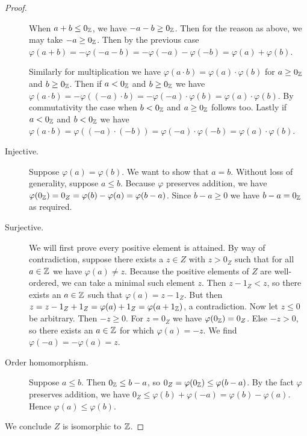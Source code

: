 \documentclass[../main.tex]{subfiles}
\begin{document}
\begin{proof}
\begin{description}
        When $a+b\leq0_{\mathbb{Z}}$, we have $-a-b\geq0_{\mathbb{Z}}$. Then for the reason as above, we may take $-a\geq0_{\mathbb{Z}}$. Then by the previous case $\varphi(a+b)=-\varphi(-a-b)=-\varphi(-a)-\varphi(-b)=\varphi(a)+\varphi(b)$.

        Similarly for multiplication we have $\varphi(a\cdot b)=\varphi(a)\cdot\varphi(b)$ for $a\geq0_{\mathbb{Z}}$ and $b\geq0_{\mathbb{Z}}$. Then if $a<0_{\mathbb{Z}}$ and $b\geq0_{\mathbb{Z}}$ we have $\varphi(a\cdot b)=-\varphi((-a)\cdot b)=-\varphi(-a)\cdot\varphi(b)=\varphi(a)\cdot\varphi(b)$. By commutativity the case when $b<0_{\mathbb{Z}}$ and $a\geq0_{\mathbb{Z}}$ follows too. Lastly if $a<0_{\mathbb{Z}}$ and $b<0_{\mathbb{Z}}$ we have $\varphi(a\cdot b)=\varphi((-a)\cdot(-b))=\varphi(-a)\cdot\varphi(-b)=\varphi(a)\cdot\varphi(b)$.
        \item[Injective.] Suppose $\varphi(a)=\varphi(b)$. We want to show that $a=b$. Without loss of generality, suppose $a\leq b$. Because $\varphi$ preserves addition, we have $\varphi(0_{\mathbb{Z}})=0_Z=\varphi(b)-\varphi(a)=\varphi(b-a)$. Since $b-a\geq0$ we have $b-a=0_{\mathbb{Z}}$ as required.
        \item[Surjective.] We will first prove every positive element is attained. By way of contradiction, suppose there exists a $z\in Z$ with $z>0_Z$ such that for all $a\in\mathbb{Z}$ we have $\varphi(a)\neq z$. Because the positive elements of $Z$ are well-ordered, we can take a minimal such element $z$. Then $z-1_Z<z$, so there exists an $a\in\mathbb{Z}$ such that $\varphi(a)=z-1_Z$. But then $z=z-1_Z+1_Z=\varphi(a)+1_Z=\varphi(a+1_{\mathbb{Z}})$, a contradiction. Now let $z\leq0$ be arbitrary. Then $-z\geq0$. For $z=0_Z$ we have $\varphi(0_{\mathbb{Z}})=0_Z$. Else $-z>0$, so there exists an $a\in\mathbb{Z}$ for which $\varphi(a)=-z$. We find $\varphi(-a)=-\varphi(a)=z$.
        \item[Order homomorphism.] Suppose $a\leq b$. Then $0_{\mathbb{Z}}\leq b-a$, so $0_Z=\varphi(0_{\mathbb{Z}})\leq\varphi(b-a)$. By the fact $\varphi$ preserves addition, we have $0_Z\leq\varphi(b)+\varphi(-a)=\varphi(b)-\varphi(a)$. Hence $\varphi(a)\leq\varphi(b)$.
    \end{description}
    We conclude $Z$ is isomorphic to $\mathbb{Z}$.
\end{proof} 
\end{document}
